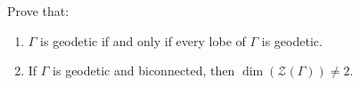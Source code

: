 Prove that:
\begin{enumerate}
\item[(a)] $\Gamma$ is geodetic if and only if every lobe of $\Gamma$ is geodetic.
\item[(b)] If $\Gamma$ is geodetic and biconnected, then $\dim(\mathcal{Z}(\Gamma)) \neq 2$.
\end{enumerate}